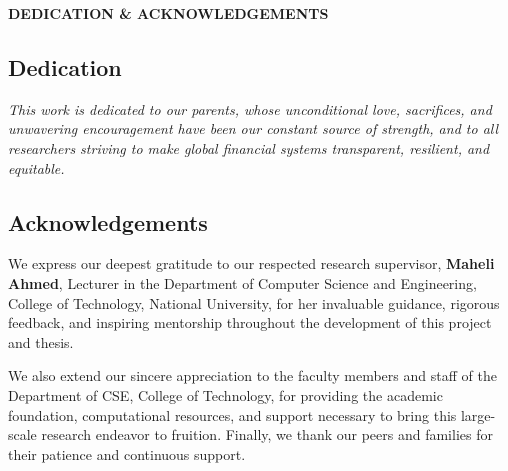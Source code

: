 \begin{center}
   \vspace*{1.0cm}
   {\Large\textbf{DEDICATION \& ACKNOWLEDGEMENTS}}\\[1.5cm]
\end{center}

\subsection*{\textbf{Dedication}}
\textit{This work is dedicated to our parents, whose unconditional love, sacrifices, and unwavering encouragement have been our constant source of strength, and to all researchers striving to make global financial systems transparent, resilient, and equitable.}

\vspace{1.2cm}

\subsection*{\textbf{Acknowledgements}}
We express our deepest gratitude to our respected research supervisor, \textbf{Maheli Ahmed}, Lecturer in the Department of Computer Science and Engineering, College of Technology, National University, for her invaluable guidance, rigorous feedback, and inspiring mentorship throughout the development of this project and thesis.

We also extend our sincere appreciation to the faculty members and staff of the Department of CSE, College of Technology, for providing the academic foundation, computational resources, and support necessary to bring this large-scale research endeavor to fruition. Finally, we thank our peers and families for their patience and continuous support.
\clearpage
